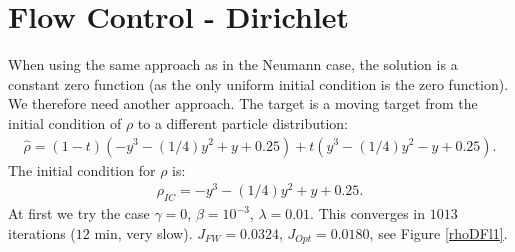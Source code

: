 \documentclass[11pt, a4paper]{article}
\theoremstyle{definition}
\begin{document}
\section{Flow Control - Dirichlet}
When using the same approach as in the Neumann case, the solution is a constant zero function (as the only uniform initial condition is the zero function). We therefore need another approach.
The target is a moving target from the initial condition of $\rho$ to a different particle distribution:
\begin{align*}
\hat \rho = (1-t)(-y^3 -(1/4)y^2 + y + 0.25) +  t(y^3 -(1/4)y^2 - y + 0.25).
\end{align*}
The initial condition for $\rho$ is:
\begin{align*}
\rho_{IC}= -y^3 -(1/4)y^2 + y + 0.25.
\end{align*}
At first we try the case $\gamma = 0$, $\beta = 10^{-3}$, $\lambda = 0.01$. This converges in $1013$ iterations ($12$ min, very slow). $J_{FW} = 0.0324$, $J_{Opt} = 0.0180$, see Figure \ref{rhoDFl1}.
\end{document}
